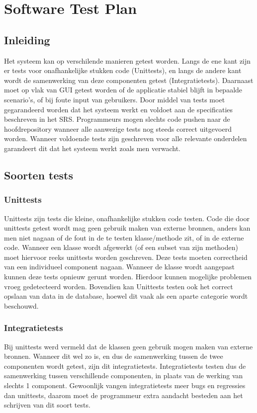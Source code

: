 \chapter{Software Test Plan}
\section{Inleiding}
Het systeem kan op verschilende manieren getest worden. 
Langs de ene kant zijn er tests voor onafhankelijke stukken code (Unittests), en langs de andere kant wordt de samenwerking van deze componenten getest (Integratietests). 
Daarnaast moet op vlak van GUI getest worden of de applicatie stabiel blijft in bepaalde scenario's, of bij foute input van gebruikers. 
Door middel van tests moet gegarandeerd worden dat het systeem werkt en voldoet aan de specificaties beschreven in het SRS\cite{srs}. 
Programmeurs mogen slechts code pushen naar de hoofdrepository wanneer alle aanwezige tests nog steeds correct uitgevoerd worden.
Wanneer voldoende tests zijn geschreven voor alle relevante onderdelen garandeert dit dat het systeem werkt zoals men verwacht.

\section{Soorten tests}

\subsection{Unittests}
Unittests zijn tests die kleine, onafhankelijke stukken code testen. Code die door unittests getest wordt mag geen gebruik maken van externe bronnen, anders kan men niet nagaan of de fout in de te testen klasse/methode zit, of in de externe code.
Wanneer een klasse wordt afgewerkt (of een subset van zijn methoden) moet hiervoor reeks unittests worden geschreven. 
Deze tests moeten correctheid van een individueel component nagaan. 
Wanneer de klasse wordt aangepast kunnen deze tests opnieuw gerunt worden. Hierdoor kunnen mogelijke problemen vroeg gedetecteerd worden.
Bovendien kan 
Unittests testen ook het correct opslaan van data in de database, hoewel dit vaak als een aparte categorie wordt beschouwd. 

\subsection{Integratietests}
Bij unittests werd vermeld dat de klassen geen gebruik mogen maken van externe bronnen. Wanneer dit wel zo is, en dus de samenwerking tussen de twee componenten wordt getest, zijn dit integratietests.
Integratietests testen dus de samenwerking tussen verschillende componenten, in plaats van de werking van slechts 1 component.
Gewoonlijk vangen integratietests meer bugs en regressies dan unittests, daarom moet de programmeur extra aandacht besteden aan het schrijven van dit soort tests.

